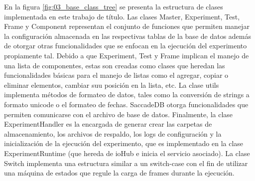 \documentclass[\main/main.tex]{subfiles}
\begin{document}
		En la figura \ref{fig:03_base_class_tree} se presenta la estructura de clases implementada en este trabajo de título. Las clases Master, Experiment, Test, Frame y Component representan el conjunto de funciones que permiten manejar la configuración almacenada en las respectivas tablas de la base de datos además de otorgar otras funcionalidades que se enfocan en la ejecución del experimento propiamente tal. Debido a que Experiment, Test y Frame implican el manejo de una lista de componentes, estas son creadas como clases que heredan las funcionalidades básicas para el manejo de listas como el agregar, copiar o eliminar elementos, cambiar suu posición en la lista, etc. La clase utils implementa métodos de formateo de datos, tales como la conversión de strings a formato unicode o el formateo de fechas. SaccadeDB otorga funcionalidades que permiten comunicarse con el archivo de base de datos. Finalmente, la clase ExperimentHandler es la encargada de generar crear las carpetas de almacenamiento, los archivos de respaldo, los logs de configuración y la inicialización de la ejecución del experimento, que es implementado en la clase ExperimentRuntime (que hereda de ioHub e inicia el servicio asociado). La clase Switch implementa una estructura similar a un switch-case con el fin de utilizar una máquina de estados que regule la carga de frames durante la ejecución. 
\end{document}
